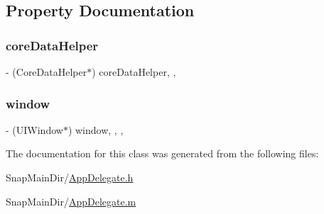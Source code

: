 \subsection{Property Documentation}
\hypertarget{interface_app_delegate_a492a9bd7c20c991d0a3c2fa2a9a69d44}{}\label{interface_app_delegate_a492a9bd7c20c991d0a3c2fa2a9a69d44} 
\subsubsection{\texorpdfstring{core\+Data\+Helper}{coreDataHelper}}
{\footnotesize\ttfamily -\/ (Core\+Data\+Helper$\ast$) core\+Data\+Helper\hspace{0.3cm}{\ttfamily [read]}, {\ttfamily [nonatomic]}, {\ttfamily [strong]}}

\hypertarget{interface_app_delegate_acf48ac24125e688cac1a85445cd7fac2}{}\label{interface_app_delegate_acf48ac24125e688cac1a85445cd7fac2} 
\subsubsection{\texorpdfstring{window}{window}}
{\footnotesize\ttfamily -\/ (U\+I\+Window$\ast$) window\hspace{0.3cm}{\ttfamily [read]}, {\ttfamily [write]}, {\ttfamily [nonatomic]}, {\ttfamily [strong]}}



The documentation for this class was generated from the following files\+:\begin{DoxyCompactItemize}
\item 
Snap\+Main\+Dir/\hyperlink{_app_delegate_8h}{App\+Delegate.\+h}\item 
Snap\+Main\+Dir/\hyperlink{_app_delegate_8m}{App\+Delegate.\+m}\end{DoxyCompactItemize}
